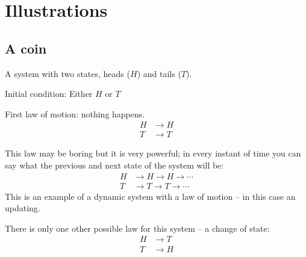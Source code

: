 \documentclass[pagesize,headsepline,10pt,parskip=half]{scrreprt}
\begin{document}
    \section{Illustrations}
      \subsection{A coin}
        A system with two states, heads ($H$) and tails ($T$).

        Initial condition: Either $H$ or $T$

        First law of motion: nothing happens.
        \begin{align*}
          H &\rightarrow H \\
          T &\rightarrow T
        \end{align*}
        \begin{center}
        \end{center}
        This law may be boring but it is very powerful; in every
        instant of time you can say what the previous and next
        state of the system will be:
        \begin{align*}
          H &\rightarrow H \rightarrow H \rightarrow \cdots \\
          T &\rightarrow T \rightarrow T \rightarrow \cdots
        \end{align*}
        This is an example of a dynamic system with a law of motion
        -- in this case an updating.

        There is only one other possible law for this system -- a
        change of state:
        \begin{align*}
          H &\rightarrow T \\
          T &\rightarrow H
        \end{align*}
        \begin{center}
        \end{center}
\end{document}
